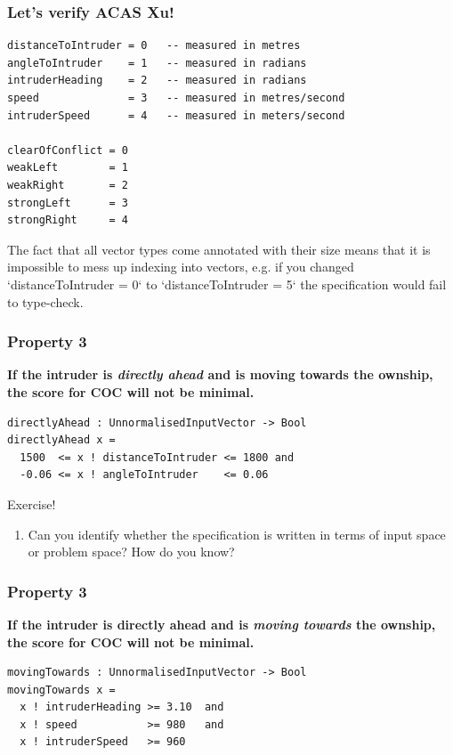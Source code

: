 \documentclass[t,compress,aspectratio=169]{beamer}
\begin{document}
\begin{frame}[fragile]
\frametitle{Let's verify ACAS Xu!}
\begin{verbatim}
distanceToIntruder = 0   -- measured in metres
angleToIntruder    = 1   -- measured in radians
intruderHeading    = 2   -- measured in radians
speed              = 3   -- measured in metres/second
intruderSpeed      = 4   -- measured in meters/second

clearOfConflict = 0
weakLeft        = 1
weakRight       = 2
strongLeft      = 3
strongRight     = 4
\end{verbatim}
\footnotesize{
The fact that all vector types come annotated with their size means that it
 is impossible to mess up indexing into vectors, e.g. if you changed
 `distanceToIntruder = 0` to `distanceToIntruder = 5` the specification would
 fail to type-check.}



\end{frame}

\begin{frame}[fragile]
\frametitle{Property 3}


\footnotesize{\textbf{If the intruder is \emph{directly ahead} and is moving towards the
 ownship, the score for COC will not be minimal.}}

\pause

\begin{verbatim}
directlyAhead : UnnormalisedInputVector -> Bool
directlyAhead x =
  1500  <= x ! distanceToIntruder <= 1800 and
  -0.06 <= x ! angleToIntruder    <= 0.06
\end{verbatim}
\pause
\begin{block}{Exercise!}
\footnotesize{
\begin{enumerate}
\item
Can you identify whether the specification is written in terms of input space or problem space? How do you know?
\end{enumerate}}
\end{block}

\end{frame}




\begin{frame}[fragile]
\frametitle{Property 3}

\footnotesize{\textbf{If the intruder is directly ahead and is \emph{moving towards} the
 ownship, the score for COC will not be minimal.}}

\pause

\begin{verbatim}
movingTowards : UnnormalisedInputVector -> Bool
movingTowards x =
  x ! intruderHeading >= 3.10  and
  x ! speed           >= 980   and
  x ! intruderSpeed   >= 960
\end{verbatim}


\end{frame}
\end{document}
